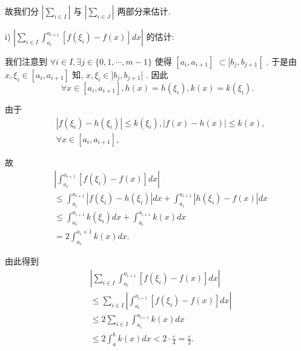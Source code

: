 故我们分 $\left| \mathop{\sum }\limits_{{i \in  I}}\right|$ 与 $\left| \mathop{\sum }\limits_{{i \in  J}}\right|$ 两部分来估计.

i) $\left| {\mathop{\sum }\limits_{{i \in  I}}{\int }_{{a}_{i}}^{{a}_{i + 1}}\left\lbrack  {f\left( {\xi }_{i}\right)  - f\left( x\right) }\right\rbrack  {dx}}\right|$ 的估计:

我们注意到 $\forall i \in  I,\exists j \in  \{ 0,1,\cdots ,m - 1\}$ 使得 $\left\lbrack  {{a}_{i},{a}_{i + 1}}\right\rbrack$  $\subset  \rbrack {b}_{j},{b}_{j + 1}\left\lbrack  \right.$ . 于是由 $x,{\xi }_{i} \in  \left\lbrack  {{a}_{i},{a}_{i + 1}}\right\rbrack$ 知, $x,{\xi }_{i} \in  \rbrack {b}_{j},{b}_{j + 1}\lbrack$ . 因此
$$\forall x \in  \left\lbrack  {{a}_{i},{a}_{i + 1}}\right\rbrack  ,h\left( x\right)  = h\left( {\xi }_{i}\right) ,k\left( x\right)  = k\left( {\xi }_{i}\right) .$$

由于
\begin{align*}
	&\left| {f\left( {\xi }_{i}\right)  - h\left( {\xi }_{i}\right) }\right|  \leq  k\left( {\xi }_{i}\right) ,\left| {f\left( x\right)  - h\left( x\right) }\right|  \leq  k\left( x\right) ,\\
	&\forall x \in  \left\lbrack  {{a}_{i},{a}_{i + 1}}\right\rbrack  ,
\end{align*}

故
\begin{align*}
	&\left| {{\int }_{{a}_{i}}^{{a}_{i + 1}}\left\lbrack  {f\left( {\xi }_{i}\right)  - f\left( x\right) }\right\rbrack  {dx}}\right|\\
	&\leq  {\int }_{{a}_{i}}^{{a}_{i + 1}}\left| {f\left( {\xi }_{i}\right)  - h\left( {\xi }_{i}\right) }\right| {dx} + {\int }_{{a}_{i}}^{{a}_{i + 1}}\left| {h\left( {\xi }_{i}\right)  - f\left( x\right) }\right| {dx}\\
	&\leq  {\int }_{{a}_{i}}^{{a}_{i + 1}}k\left( {\xi }_{i}\right) {dx} + {\int }_{{a}_{i}}^{{a}_{i + 1}}k\left( x\right) {dx}\\
	&= 2{\int }_{{a}_{i}}^{{a}_{i} + 1}k\left( x\right) {dx}.
\end{align*}

由此得到
\begin{align*}
	&\left| {\mathop{\sum }\limits_{{i \in  I}}{\int }_{{a}_{i}}^{{a}_{i + 1}}\left\lbrack  {f\left( {\xi }_{i}\right)  - f\left( x\right) }\right\rbrack  {dx}}\right|\\
	&\leq  \mathop{\sum }\limits_{{i \in  I}}\left| {{\int }_{{a}_{i}}^{{a}_{i + 1}}\left\lbrack  {f\left( {\xi }_{i}\right)  - f\left( x\right) }\right\rbrack  {dx}}\right|\\
	&\leq  2\mathop{\sum }\limits_{{i \in  I}}{\int }_{{a}_{i}}^{{a}_{i + 1}}k\left( x\right) {dx}\\
	&\leq  2{\int }_{a}^{b}k\left( x\right) {dx} < 2 \cdot  \frac{\varepsilon }{4} = \frac{\varepsilon }{2}.
\end{align*}

